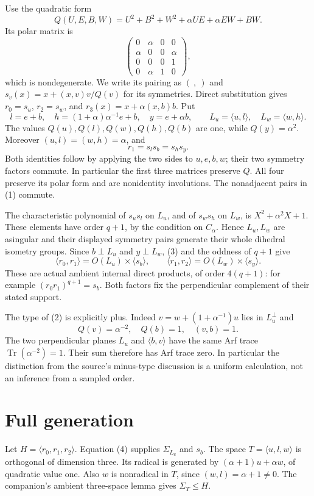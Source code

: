\documentclass[11pt,a4paper]{article}
\newcommand{\gen}[1]{\langle#1\rangle}
\begin{document}
Use the quadratic form
\[
 Q(U,E,B,W)=U^2+B^2+W^2+\alpha UE+\alpha EW+BW.       \tag{2}
\]
Its polar matrix is
\[
 \begin{pmatrix}0&\alpha&0&0\\\alpha&0&0&\alpha\\
 0&0&0&1\\0&\alpha&1&0\end{pmatrix},
\]
which is nondegenerate. We write its pairing as $(\ ,\ )$ and
$s_v(x)=x+(x,v)v/Q(v)$ for its symmetries. Direct substitution gives
$r_0=s_u$, $r_2=s_w$, and $r_3(x)=x+\alpha(x,b)b$.
Put
\[
 l=e+b,\quad h=(1+\alpha)\alpha^{-1}e+b,\quad y=e+\alpha b,
 \qquad L_u=\gen{u,l},\quad L_w=\gen{w,h}.
\]
The values $Q(u),Q(l),Q(w),Q(h),Q(b)$ are one, while $Q(y)=\alpha^2$.
Moreover $(u,l)=(w,h)=\alpha$, and
\[
                 r_1=s_ls_b=s_hs_y.                         \tag{3}
\]
Both identities follow by applying the two sides to $u,e,b,w$;
their two symmetry factors commute. In particular the first three
matrices preserve $Q$. All four preserve its polar form and are
nonidentity involutions. The nonadjacent pairs in (1) commute.

The characteristic polynomial of $s_us_l$ on $L_u$, and of $s_ws_h$
on $L_w$, is $X^2+\alpha^2X+1$. These elements have order $q+1$,
by the condition on $C_\alpha$. Hence $L_u,L_w$ are asingular and
their displayed symmetry pairs generate their whole dihedral
isometry groups. Since $b\perp L_u$ and $y\perp L_w$, (3) and the
oddness of $q+1$ give
\[
 \gen{r_0,r_1}=O(L_u)\times\gen{s_b},\qquad
 \gen{r_1,r_2}=O(L_w)\times\gen{s_y}.                         \tag{4}
\]
These are actual ambient internal direct products, of order $4(q+1)$:
for example $(r_0r_1)^{q+1}=s_b$. Both factors fix the perpendicular
complement of their stated support.

The type of (2) is explicitly plus. Indeed
$v=w+(1+\alpha^{-1})u$ lies in $L_u^\perp$ and
\[
 Q(v)=\alpha^{-2},\quad Q(b)=1,\quad(v,b)=1.
\]
The two perpendicular planes $L_u$ and $\gen{b,v}$ have the same
Arf trace $\operatorname{Tr}(\alpha^{-2})=1$. Their sum therefore
has Arf trace zero. In particular the distinction from the source's
minus-type discussion is a uniform calculation, not an inference
from a sampled order.

\section{Full generation}
Let $H=\gen{r_0,r_1,r_2}$. Equation (4) supplies $\Sigma_{L_u}$
and $s_b$. The space $T=\gen{u,l,w}$ is orthogonal of dimension
three. Its radical is generated by $(\alpha+1)u+\alpha w$, of
quadratic value one. Also $w$ is nonradical in $T$, since
$(w,l)=\alpha+1\ne0$. The companion's ambient three-space lemma
gives $\Sigma_T\leq H$.
\end{document}
